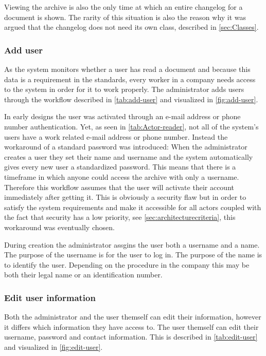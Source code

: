 Viewing the archive is also the only time at which an entire changelog for a document is shown.
The rarity of this situation is also the reason why it was argued that the changelog does not need its own class, described in \cref{sec:Classes}.

\subsubsection{Add user}
As the system monitors whether a user has read a document and because this data is a requirement in the standards, every worker in a company needs access to the system in order for it to work properly.
The administrator adds users through the workflow described in \cref{tab:add-user} and visualized in \cref{fig:add-user}.




In early designs the user was activated through an e-mail address or phone number authentication.
Yet, as seen in \cref{tab:Actor-reader}, not all of the system's users have a work related e-mail address or phone number.
Instead the workaround of a standard password was introduced:
When the administrator creates a user they set their name and username and the system automatically gives every new user a standardized password.
This means that there is a timeframe in which anyone could access the archive with only a username.
Therefore this workflow assumes that the user will activate their account immediately after getting it.
This is obviously a security flaw but in order to satisfy the system requirements and make it accessible for all actors coupled with the fact that security has a low priority, see \cref{sec:architecturecriteria}, this workaround was eventually chosen.

During creation the administrator assgins the user both a username and a name.
The purpose of the username is for the user to log in.
The purpose of the name is to identify the user.
Depending on the procedure in the company this may be both their legal name or an identification number.

\subsubsection{Edit user information}
Both the administrator and the user themself can edit their information, however it differs which information they have access to. The user themself can edit their username, password and contact information. This is described in \cref{tab:edit-user} and visualized in \cref{fig:edit-user}.

